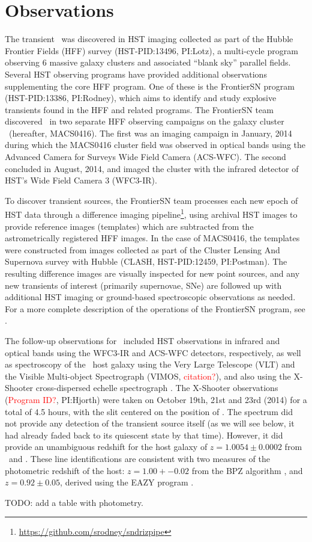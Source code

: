 \section{Observations}\label{sec:Observations}

The transient \spock\ was discovered in HST imaging collected as part
of the Hubble Frontier Fields (HFF) survey (HST-PID:13496, PI:Lotz), a
multi-cycle program observing 6 massive galaxy clusters and associated
``blank sky'' parallel fields.  Several HST observing programs have
provided additional observations supplementing the core HFF program.
One of these is the FrontierSN program (HST-PID:13386, PI:Rodney),
which aims to identify and study explosive transients found in the HFF
and related programs.  The FrontierSN team discovered \spock\ in two
separate HFF observing campaigns on the galaxy cluster
\ (hereafter, MACS0416).  The first was an imaging campaign
in January, 2014 during which the MACS0416 cluster field was observed
in optical bands using the Advanced Camera for Surveys Wide Field
Camera (ACS-WFC).  The second concluded in August, 2014, and imaged
the cluster with the infrared detector of HST's Wide Field Camera 3
(WFC3-IR).

To discover transient sources, the FrontierSN team processes each new
epoch of HST data through a difference imaging
pipeline\footnote{\url{https://github.com/srodney/sndrizpipe}}, using
archival HST images to provide reference images (templates) which are
subtracted from the astrometrically registered HFF images. In the case
of MACS0416, the templates were constructed from images collected as
part of the Cluster Lensing And Supernova survey with Hubble (CLASH,
HST-PID:12459, PI:Postman). The resulting difference images are
visually inspected for new point sources, and any new transients of
interest (primarily supernovae, SNe) are followed up with additional
HST imaging or ground-based spectroscopic observations as needed.  For
a more complete description of the operations of the FrontierSN
program, see \citet{Rodney:2015b}.

The follow-up observations for \spock\ included HST observations in
infrared and optical bands using the WFC3-IR and ACS-WFC detectors,
respectively, as well as spectroscopy of the \spock\ host galaxy using
the Very Large Telescope (VLT) and the Visible Multi-object
Spectrograph (VIMOS, \textcolor{red}{citation?}), and also using the
X-Shooter cross-dispersed echelle spectrograph
\citep{Vernet:2011}. The X-Shooter observations
(\textcolor{red}{Program ID?}, PI:Hjorth) were taken on October 19th,
21st and 23rd (2014) for a total of 4.5 hours, with the slit centered
on the position of .  The spectrum did not provide any
detection of the transient source itself (as we will see below, it had
already faded back to its quiescent state by that time).  However, it
did provide an unambiguous redshift for the host galaxy of
$z=1.0054\pm0.0002$ from \Ha\ and .  These line
identifications are consistent with two measures of the photometric
redshift of the host: $z=1.00+-0.02$ from the BPZ algorithm
\citep{Benitez:2000}, and $z=0.92\pm0.05$, derived using the EAZY
program \citep{Brammer:2008}.


TODO: add a table with photometry.


  
  

  